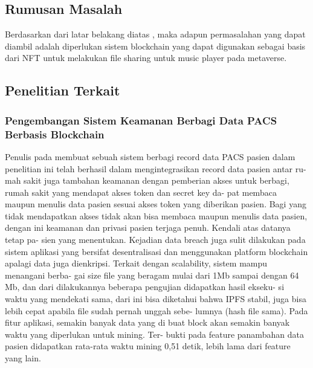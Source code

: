 \subsection{Rumusan Masalah}

Berdasarkan dari latar belakang diatas , maka adapun permasalahan yang dapat diambil adalah diperlukan sistem blockchain yang dapat digunakan sebagai basis dari NFT untuk melakukan file sharing untuk music player pada metaverse. 

\subsection{Penelitian Terkait}

\subsubsection{Pengembangan Sistem Keamanan Berbagi Data PACS Berbasis Blockchain}
Penulis pada \citep{DitoPrabowo2020} membuat sebuah sistem berbagi record data PACS pasien dalam penelitian ini
telah berhasil dalam mengintegrasikan record data pasien antar ru-
mah sakit juga tambahan keamanan dengan pemberian akses untuk
berbagi, rumah sakit yang mendapat akses token dan secret key da-
pat membaca maupun menulis data pasien sesuai akses token yang
diberikan pasien. Bagi yang tidak mendapatkan akses tidak akan
bisa membaca maupun menulis data pasien, dengan ini keamanan
dan privasi pasien terjaga penuh. Kendali atas datanya tetap pa-
sien yang menentukan. Kejadian data breach juga sulit dilakukan
pada sistem aplikasi yang bersifat desentralisasi dan menggunakan
platform blockchain apalagi data juga dienkripsi.
Terkait dengan scalability, sistem mampu menangani berba-
gai size file yang beragam mulai dari 1Mb sampai dengan 64 Mb,
dan dari dilakukannya beberapa pengujian didapatkan hasil ekseku-
si waktu yang mendekati sama, dari ini bisa diketahui bahwa IPFS
stabil, juga bisa lebih cepat apabila file sudah pernah unggah sebe-
lumnya (hash file sama).
Pada fitur aplikasi, semakin banyak data yang di buat block
akan semakin banyak waktu yang diperlukan untuk mining. Ter-
bukti pada feature panambahan data pasien didapatkan rata-rata
waktu mining 0,51 detik, lebih lama dari feature yang lain.

